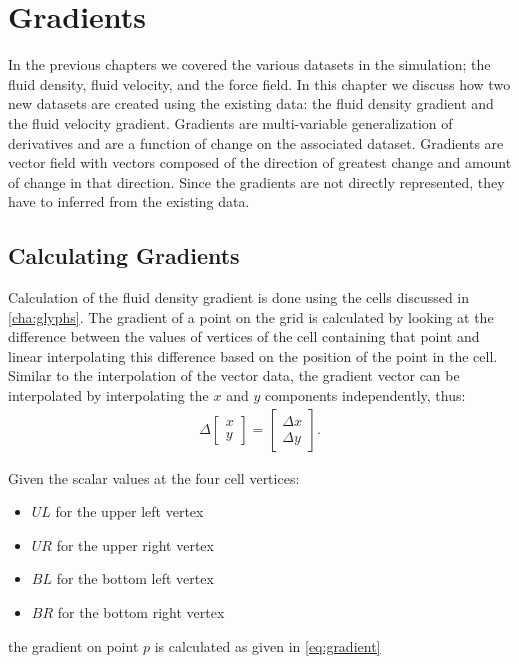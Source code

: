 \chapter{Gradients} %
\label{cha:gradients}
In the previous chapters we covered the various datasets in the simulation; the fluid density, fluid velocity, and the force field. In this chapter we discuss how two new datasets are created using the existing data: the fluid density gradient and the fluid velocity gradient. Gradients are multi-variable generalization of derivatives and are a function of change on the associated dataset. Gradients are vector field with vectors composed of the direction of greatest change and amount of change in that direction. Since the gradients are not directly represented, they have to inferred from the existing data.

\section{Calculating Gradients} %
\label{sec:calculating_gradients}
Calculation of the fluid density gradient is done using the cells discussed in \cref{cha:glyphs}. The gradient of a point on the grid is calculated by looking at the difference between the values of vertices of the cell containing that point and linear interpolating this difference based on the position of the point in the cell. Similar to the interpolation of the vector data, the gradient vector can be interpolated by interpolating the $x$ and $y$ components independently, thus: 
\begin{align*}
\Delta \begin{bmatrix}x\\y \end{bmatrix} = \begin{bmatrix}\Delta x\\\Delta y \end{bmatrix} .
\end{align*}

Given the scalar values at the four cell vertices:
\begin{itemize}
	\item $UL$ for the upper left vertex
	\item $UR$ for the upper right vertex
	\item $BL$ for the bottom left vertex
	\item $BR$ for the bottom right vertex
\end{itemize}
the gradient on point $p$ is calculated as given in \cref{eq:gradient}

